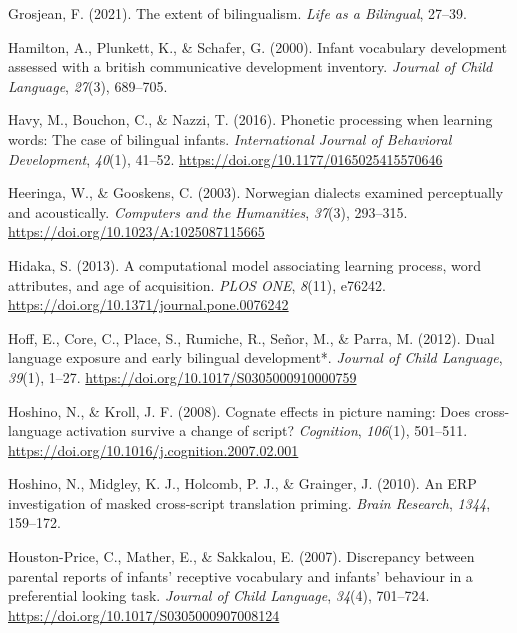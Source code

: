 \documentclass[
]{article}
\newlength{\cslhangindent}
\newlength{\cslentryspacingunit} %
\newenvironment{CSLReferences}[2] %
 {%
  \setlength{\parindent}{0pt}
  \ifodd #1
  \let\oldpar\par
  \def\par{\hangindent=\cslhangindent\oldpar}
  \fi
  \setlength{\parskip}{#2\cslentryspacingunit}
 }%
 {}
\begin{document}
\begin{CSLReferences}{1}{0}
\leavevmode{}%
Grosjean, F. (2021). The extent of bilingualism. \emph{Life as a
Bilingual}, 27--39.

\leavevmode{}%
Hamilton, A., Plunkett, K., \& Schafer, G. (2000). Infant vocabulary
development assessed with a british communicative development inventory.
\emph{Journal of Child Language}, \emph{27}(3), 689--705.

\leavevmode{}%
Havy, M., Bouchon, C., \& Nazzi, T. (2016). Phonetic processing when
learning words: The case of bilingual infants. \emph{International
Journal of Behavioral Development}, \emph{40}(1), 41--52.
\url{https://doi.org/10.1177/0165025415570646}

\leavevmode{}%
Heeringa, W., \& Gooskens, C. (2003). Norwegian dialects examined
perceptually and acoustically. \emph{Computers and the Humanities},
\emph{37}(3), 293--315. \url{https://doi.org/10.1023/A:1025087115665}

\leavevmode{}%
Hidaka, S. (2013). A computational model associating learning process,
word attributes, and age of acquisition. \emph{{PLOS} {ONE}},
\emph{8}(11), e76242. \url{https://doi.org/10.1371/journal.pone.0076242}

\leavevmode{}%
Hoff, E., Core, C., Place, S., Rumiche, R., Señor, M., \& Parra, M.
(2012). Dual language exposure and early bilingual development*.
\emph{Journal of Child Language}, \emph{39}(1), 1--27.
\url{https://doi.org/10.1017/S0305000910000759}

\leavevmode{}%
Hoshino, N., \& Kroll, J. F. (2008). Cognate effects in picture naming:
Does cross-language activation survive a change of script?
\emph{Cognition}, \emph{106}(1), 501--511.
\url{https://doi.org/10.1016/j.cognition.2007.02.001}

\leavevmode{}%
Hoshino, N., Midgley, K. J., Holcomb, P. J., \& Grainger, J. (2010). An
ERP investigation of masked cross-script translation priming.
\emph{Brain Research}, \emph{1344}, 159--172.

\leavevmode{}%
Houston-Price, C., Mather, E., \& Sakkalou, E. (2007). Discrepancy
between parental reports of infants' receptive vocabulary and infants'
behaviour in a preferential looking task. \emph{Journal of Child
Language}, \emph{34}(4), 701--724.
\url{https://doi.org/10.1017/S0305000907008124}


\end{CSLReferences}
\end{document}
